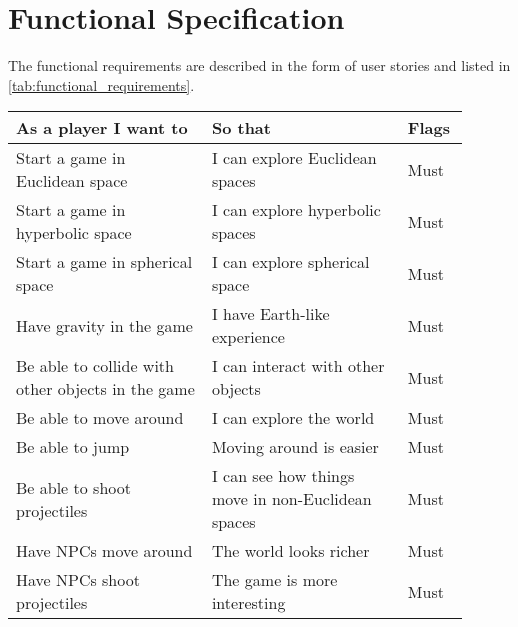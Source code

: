 \chapter{Functional Specification}\label{ch:functional_specification}
The functional requirements are described in the form of user stories and listed in \autoref{tab:functional_requirements}.

\begin{table}[!htb]
    \begin{tabular}{|p{0.4\linewidth}|p{0.4\linewidth}|p{0.1\linewidth}|}
        \hline
        \textbf{As a player I want to}                             & \textbf{So that}                                                   & \textbf{Flags} \\
        \hline
        Start a game in Euclidean space                            & I can explore Euclidean spaces                                     & Must           \\
        Start a game in hyperbolic space                           & I can explore hyperbolic spaces                                    & Must           \\
        Start a game in spherical space                            & I can explore spherical space                                      & Must           \\
        Have gravity in the game                                   & I have Earth-like experience                                       & Must           \\
        Be able to collide with other objects in the game          & I can interact with other objects                                  & Must           \\
        Be able to move around                                     & I can explore the world                                            & Must           \\
        Be able to jump                                            & Moving around is easier                                            & Must           \\
        Be able to shoot projectiles                               & I can see how things move in non-Euclidean spaces                  & Must           \\
        Have NPCs move around                                      & The world looks richer                                             & Must           \\
        Have NPCs shoot projectiles                                & The game is more interesting                                       & Must           \\

\end{tabular}
\end{table}
